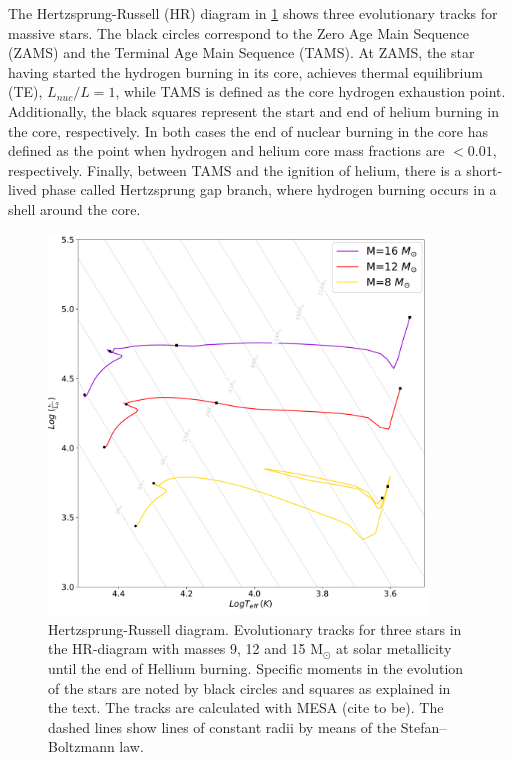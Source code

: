 The Hertzsprung-Russell (HR) diagram in \cref{fig:HR_massive_stars} shows three evolutionary tracks for massive stars. The black circles correspond to the Zero Age Main Sequence (ZAMS) and the Terminal Age Main Sequence (TAMS). At ZAMS, the star having started the hydrogen burning in its core, achieves thermal equilibrium (TE), $L_{nuc}/L =1$, while TAMS is defined as the core hydrogen exhaustion point. Additionally, the black squares represent the start and end of helium burning in the core, respectively. In both cases the end of nuclear burning in the core has defined as the point when hydrogen and helium core mass fractions are $< 0.01$, respectively. Finally, between TAMS and the ignition of helium, there is a short-lived phase called Hertzsprung gap branch, where hydrogen burning occurs in a shell around the core. 

\begin{figure}[H]
    \centering
    \includegraphics[width=0.9\textwidth]{Thesis/graphs/HR_massive_stars.pdf}
    \caption{Hertzsprung-Russell diagram. Evolutionary tracks for three stars in the HR-diagram with masses 9, 12 and 15 M$_{\odot}$ at solar metallicity until the end of Hellium burning. Specific moments in the evolution of the stars are noted by black circles and squares as explained in the text. The tracks are calculated with MESA (cite to be). The dashed lines show lines of constant radii by means of the Stefan–Boltzmann law.}
    \label{fig:HR_massive_stars}
\end{figure}

